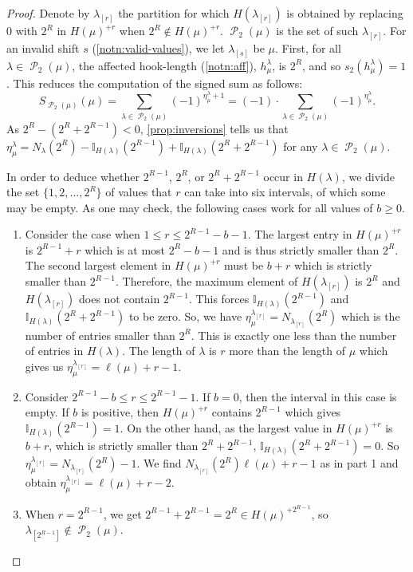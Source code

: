 \documentclass[12pt]{amsart}
\theoremstyle{definition}
\numberwithin{equation}{section}
\newcommand{\la}{\lambda}
\DeclareMathOperator{\p}{\mathcal{P}}
\begin{document}
\begin{proof}
Denote by $\lambda_{[r]}$ the partition for which $H(\la_{[r]})$ is obtained by replacing 0 with $2^R$ in $ H(\mu)^{+r}$ when $2^R\not\in H(\mu)^{+r}$. $\p_2(\mu)$ is the set of such $\la_{[r]}$. For an invalid shift $s$ (\cref{notn:valid-values}), we let $\la_{[s]}$ be $\mu$. First, for all $\lambda\in\p_2(\mu)$, the affected hook-length (\cref{notn:aff}), $h^\lambda_\mu$, is  $2^R$, and so $s_2(h^\lambda_\mu) = 1$. This reduces the computation of the signed sum as follows:
\[
S_{\p_2(\mu)}({\mu}) = \sum\limits_{\lambda\in \p_2(\mu)} (-1)^{\eta^\lambda_\mu + 1} = (-1)\cdot\sum\limits_{\lambda\in \p_2(\mu)} (-1)^{\eta^\lambda_\mu}.
\]
As $2^R - (2^R+ 2^{R-1}) < 0$,   \cref{prop:inversions} tells us that $
\eta^\lambda_\mu = N_{\lambda}(2^R) - \mathbb{I}_{H(\lambda)}(2^{R-1}) + \mathbb{I}_{H(\lambda)}(2^R +2^{R-1})$ for any $\la\in \p_2(\mu)$.

In order to deduce whether $2^{R-1}$, $2^R$, or $2^{R}+2^{R-1}$ occur in $H(\la)$, we divide the set $\{1,2,\ldots, 2^R\}$ of values that $r$ can take into six intervals, of which some may be empty. As one may check, the following cases work for all values of $b\geq 0$.
\begin{enumerate}
\item Consider the case when {$1 \leq r\leq 2^{R-1} - b - 1$}. The largest entry in $H(\mu)^{+r}$ is $2^{R-1} + r$ which is at most $ 2^{R} - b -1$ and is thus strictly smaller than $2^R$. The second largest element in $H(\mu)^{+r}$ must be $b+r$ which is strictly smaller than $2^{R-1}$. Therefore, the maximum element of $H(\la_{[r]})$ is $2^R$ and $H(\la_{[r]})$ does not contain $2^{R-1}$. This forces $\mathbb{I}_{H(\lambda)}(2^{R-1})$ and $ \mathbb{I}_{H(\lambda)}(2^R +2^{R-1})$ to be zero. So, we have $\eta^{\lambda_{[r]}}_\mu = N_{\lambda_{[r]}}(2^R)$ which is the number of entries smaller than $2^R$. This is exactly one less than the number of entries in $H(\la)$. The length of $\la$ is $r$ more than the length of $\mu$ which gives us $\eta^{\lambda_{[r]}}_\mu = \ell(\mu) + r - 1$.

\item Consider {$2^{R-1} - b \leq r \leq 2^{R-1}-1$}. If $b = 0$, then the interval in this case is empty. If $b$ is positive, then $H(\mu)^{+r}$ contains $2^{R-1}$ which gives $\mathbb{I}_{H(\lambda)}(2^{R-1})=1$. On the other hand, as the largest value in $H(\mu)^{+r}$ is $b+r$, which is strictly smaller than $2^R + 2^{R-1}$, $\mathbb{I}_{H(\lambda)}(2^R + 2^{R-1})=0$. So $\eta^{\lambda_{[r]}}_\mu = N_{\lambda_{[r]}}(2^R) - 1$. We find $N_{\lambda_{[r]}}(2^R) \ell(\mu) + r-1$ as in part 1 and obtain $\eta^{\lambda_{[r]}}_\mu = \ell(\mu) + r - 2$.
\item When $r = 2^{R-1}$, we get $2^{R-1} + 2^{R-1} = 2^R\in H(\mu)^{+2^{R-1}}$, so $\lambda_{[2^{R-1}]} \not\in \p_2(\mu)$.


\end{enumerate}
\end{proof}
\end{document}
